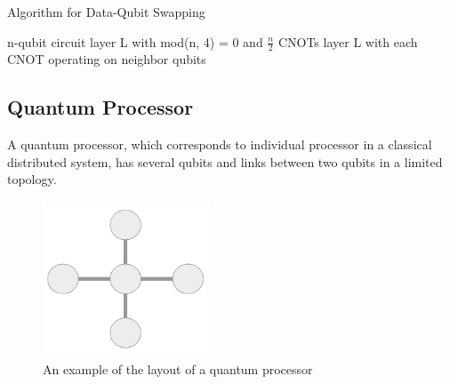 \begin{algorithm}
 \caption{Algorithm for Data-Qubit Swapping}
 \begin{algorithmic}[1]
  \Require n-qubit circuit layer L with mod(n, 4) = 0 and $\frac{n}{2}$ CNOTs
  \Ensure  layer L with each CNOT operating on neighbor qubits
    \Else
    \EndIf
    
    \EndIf
    
\EndFunction

 \end{algorithmic} 
 \end{algorithm}

\newpage

 \subsection{Quantum Processor}
  A quantum processor, which corresponds to individual processor in a classical distributed system, has several qubits and links between two qubits in a limited topology.
  
  \begin{figure}[ht]
  	\begin{center}
  		\includegraphics[width=5cm]{img/processor.png}
		\caption{An example of the layout of a quantum processor}
	\end{center}
\end{figure}
	
